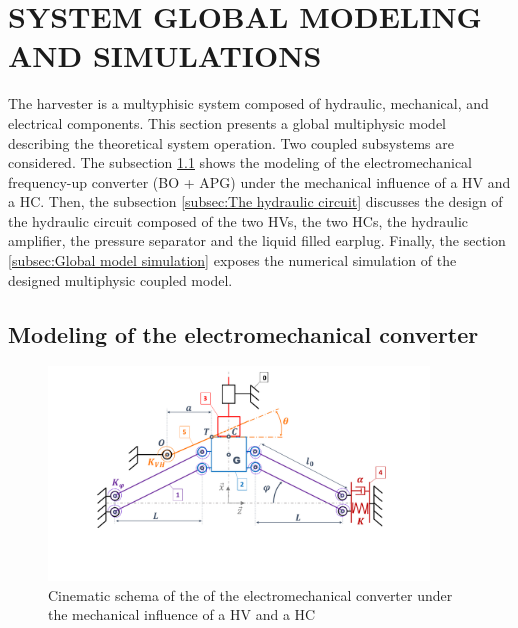 \documentclass[3p,twocolumn,preprint]{elsarticle}
\begin{document}
\section{SYSTEM GLOBAL MODELING AND SIMULATIONS}
\label{sec:SYSTEM MODELING AND SIMULATIONS}
The harvester is a multyphisic system composed of hydraulic, mechanical, and electrical components. This section presents a global multiphysic model describing the theoretical system operation. Two coupled subsystems are considered. The subsection \ref{subsec:The electromechanical converter} shows the modeling of the electromechanical frequency-up converter (BO + APG) under the mechanical influence of a HV and a HC. Then, the subsection \ref{subsec:The hydraulic circuit} discusses the design of the hydraulic circuit composed of the two HVs, the two HCs, the hydraulic amplifier, the pressure separator and the liquid filled earplug. Finally, the section \ref{subsec:Global model simulation} exposes the numerical simulation of the designed multiphysic coupled model.

	\subsection{Modeling of the electromechanical converter}	
	\label{subsec:The electromechanical converter}
\begin{figure}[!htbp]
	\centering
	\captionsetup{justification=centering}
	\includegraphics[trim={0cm 0cm 0cm 0cm},clip, width=0.9\textwidth]{figures/schema_cinematique1.pdf}
	\caption{Cinematic schema of the of the electromechanical converter under the mechanical influence of a HV and a HC}
	\label{fig:schema_cinematique1}
\end{figure}
\end{document}
